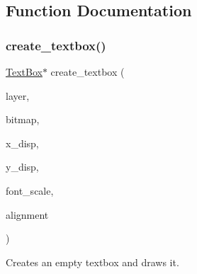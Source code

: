 \subsection{Function Documentation}
\mbox{\label{group__textbox_gabf9a7ec0dd3b157d66069418c95318ea}} 
\subsubsection{\texorpdfstring{create\+\_\+textbox()}{create\_textbox()}}
{\footnotesize\ttfamily \mbox{\hyperlink{struct_text_box}{Text\+Box}}$\ast$ create\+\_\+textbox (\begin{DoxyParamCaption}\item[{\mbox{\hyperlink{struct_layer}{Layer}} $\ast$}]{layer,  }\item[{\mbox{\hyperlink{struct_bitmap}{Bitmap}} $\ast$}]{bitmap,  }\item[{uint16\+\_\+t}]{x\+\_\+disp,  }\item[{uint16\+\_\+t}]{y\+\_\+disp,  }\item[{uint8\+\_\+t}]{font\+\_\+scale,  }\item[{\mbox{\hyperlink{group__textbox_gaa56f1a82069b5feeadbb4591cb3e474f}{Text\+Alignment}}}]{alignment }\end{DoxyParamCaption})}



Creates an empty textbox and draws it. 



